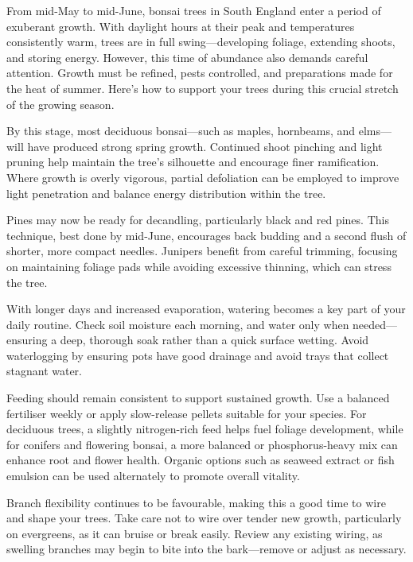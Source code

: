 \label{2025-05-care}
\noindent
From mid\--May to mid\--June, bonsai trees in South England enter a period of exuberant growth.
With daylight hours at their peak and temperatures consistently warm, trees are in full swing---developing foliage, extending shoots, and storing energy.
However, this time of abundance also demands careful attention.
Growth must be refined, pests controlled, and preparations made for the heat of summer.
Here's how to support your trees during this crucial stretch of the growing season.

\medskip
{}
\noindent
By this stage, most deciduous bonsai---such as maples, hornbeams, and elms---will have produced strong spring growth.
Continued shoot pinching and light pruning help maintain the tree's silhouette and encourage finer ramification.
Where growth is overly vigorous, partial defoliation can be employed to improve light penetration and balance energy distribution within the tree.

Pines may now be ready for decandling, particularly black and red pines.
This technique, best done by mid\--June, encourages back budding and a second flush of shorter, more compact needles.
Junipers benefit from careful trimming, focusing on maintaining foliage pads while avoiding excessive thinning, which can stress the tree.

\medskip
{}
\noindent
With longer days and increased evaporation, watering becomes a key part of your daily routine.
Check soil moisture each morning, and water only when needed---ensuring a deep, thorough soak rather than a quick surface wetting.
Avoid waterlogging by ensuring pots have good drainage and avoid trays that collect stagnant water.

Feeding should remain consistent to support sustained growth.
Use a balanced fertiliser weekly or apply slow\--release pellets suitable for your species.
For deciduous trees, a slightly nitrogen\--rich feed helps fuel foliage development, while for conifers and flowering bonsai, a more balanced or phosphorus\--heavy mix can enhance root and flower health.
Organic options such as seaweed extract or fish emulsion can be used alternately to promote overall vitality.

\medskip
{}
\noindent
Branch flexibility continues to be favourable, making this a good time to wire and shape your trees.
Take care not to wire over tender new growth, particularly on evergreens, as it can bruise or break easily.
Review any existing wiring, as swelling branches may begin to bite into the bark---remove or adjust as necessary.

